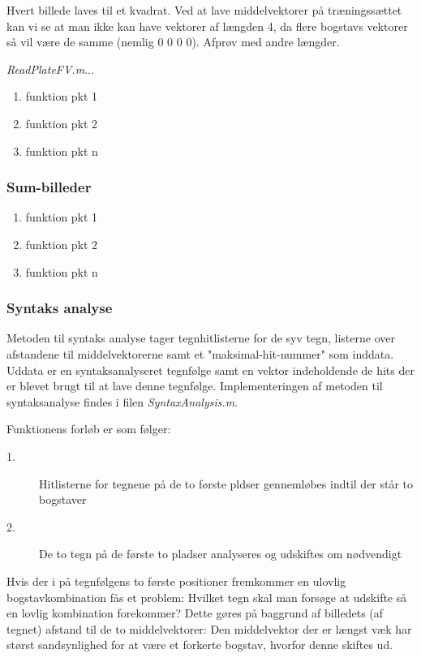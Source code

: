 Hvert billede laves til et kvadrat. Ved at lave middelvektorer på træningssættet kan vi se at man ikke kan have vektorer af længden 4, da flere bogstavs vektorer så vil være de samme (nemlig 0 0 0 0). Afprøv med andre længder.

\textit{ReadPlateFV.m}...

\begin{enumerate}
\item funktion pkt 1
\item funktion pkt 2
\item funktion pkt n
\end{enumerate}

\subsubsection{Sum-billeder}

\begin{enumerate}
\item funktion pkt 1
\item funktion pkt 2
\item funktion pkt n
\end{enumerate}

\subsubsection{Syntaks analyse}

Metoden til syntaks analyse tager tegnhitlisterne for de syv tegn, listerne over afstandene til middelvektorerne samt et "maksimal-hit-nummer" som inddata. Uddata er en syntaksanalyseret tegnfølge samt en vektor indeholdende de hits der er blevet brugt til at lave denne tegnfølge. Implementeringen af metoden til syntaksanalyse findes i filen \textit{SyntaxAnalysis.m}.

Funktionens forløb er som følger:

\begin{description}
\item[1.] Hitlisterne for tegnene på de to første pldser gennemløbes indtil der står to bogstaver
\item[2.] De to tegn på de første to pladser analyseres og udskiftes om nødvendigt
\end{description}

Hvis der i på tegnfølgens to første positioner fremkommer en ulovlig bogstavkombination fås et problem: Hvilket tegn skal man forsøge at udskifte så en lovlig kombination forekommer? Dette gøres på baggrund af billedets (af tegnet) afstand til de to middelvektorer: Den middelvektor der er længst væk har størst sandsynlighed for at være et forkerte bogstav, hvorfor denne skiftes ud.

